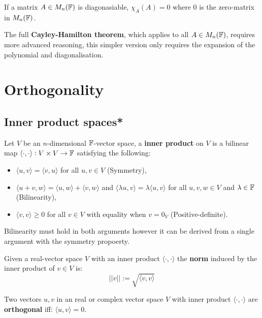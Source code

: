 \documentclass[../Year1/Year1.tex]{subfiles}
\begin{document}
\begin{theorem}
    If a matrix $A\in M_n(\mathbb{F})$ is diagonasiable, $\chi_A(A)=0$ where $0$ is the zero-matrix in $M_n(\mathbb{F})$.
\end{theorem}

\begin{note}
    The full \textbf{Cayley-Hamilton theorem}, which applies to all $A\in M_n(\mathbb{F})$, requires more advanced reasoning, this simpler version only requires the expansion of the polynomial and diagonalisation.
\end{note}

\section{Orthogonality}

\subsection{Inner product spaces*}

\begin{definition}
    Let $V$ be an $n$-dimensional $\mathbb{F}$-vector space, a \textbf{inner product} on $V$ is a bilinear map $\langle\cdot,\cdot\rangle: V \times V \rightarrow \mathbb{F}$ satisfying the following: \begin{itemize}
        \item $\langle u,v \rangle=\langle v,u \rangle$ for all $u,v\in V$ (Symmetry),
        \item $\langle u+v,w \rangle=\langle u,w \rangle+\langle v,w \rangle$ and $\langle \lambda u,v \rangle=\lambda\langle u,v \rangle$ for all $u,v,w\in V$ and $\lambda\in\mathbb{F}$ (Bilinearity),
        \item $\langle v,v \rangle\geq 0$ for all $v\in V$ with equality when $v=0_V$ (Positive-definite).
    \end{itemize}
    Bilinearity must hold in both arguments however it can be derived from a single argument with the symmetry propoerty.
\end{definition}

\begin{definition}[Norm]
    Given a real-vector space $V$ with an inner product $\langle\cdot,\cdot\rangle$ the \textbf{norm} induced by the inner product of $v\in V$ is: \[
        ||v|| := \sqrt{\langle v,v\rangle}
    \]
\end{definition}

\begin{definition}[Orthogonality]
    Two vectors $u,v$ in an real or complex vector space $V$  with inner product $\langle\cdot,\cdot\rangle$ are \textbf{orthogonal} iff: $\langle u, v\rangle=0$.
\end{definition}
\end{document}
